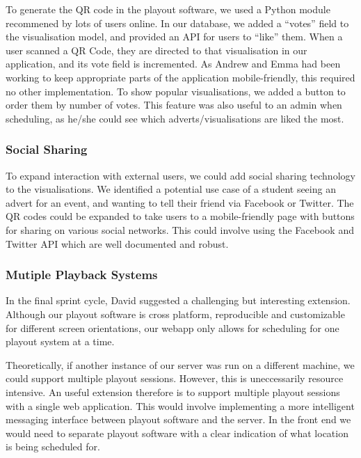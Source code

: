 \documentclass[a4paper, titlepage]{article}
\begin{document}
To generate the QR code in the playout software, we used a Python module recommened by lots of users 
online. In our database, we added a ``votes'' field to the visualisation model, and provided an API
for users to ``like'' them. When a user scanned a QR Code, they are directed to that visualisation in 
our application, and its vote field is incremented. As Andrew and Emma had been working to keep 
appropriate parts of the application mobile-friendly, this required no other implementation. To show 
popular visualisations, we added a button to order them by number of votes. This feature was also 
useful to an admin when scheduling, as he/she could see which adverts/visualisations are liked the 
most. 


\subsubsection{Social Sharing}
To expand interaction with external users, we could add social sharing technology to the 
visualisations. We identified a potential use case of a student seeing an advert for an event, and 
wanting to tell their friend via Facebook or Twitter. The QR codes could be expanded to take users to
a mobile-friendly page with buttons for sharing on various social networks. This could involve using 
the Facebook and Twitter API which are well documented and robust. 


\subsubsection{Mutiple Playback Systems}
In the final sprint cycle, David suggested a challenging but interesting extension. Although our 
playout software is cross platform, reproducible and customizable for different screen orientations, 
our webapp only allows for scheduling for one playout system at a time. 

Theoretically, if another instance of our server was run on a different machine, we could support 
multiple playout sessions. However, this is uneccessarily resource intensive. An useful extension 
therefore is to support multiple playout sessions with a single web application. This would involve 
implementing a more intelligent messaging interface between playout software and the server. In the 
front end we would need to separate playout software with a clear indication of what location is
being scheduled for. 


\end{document}
